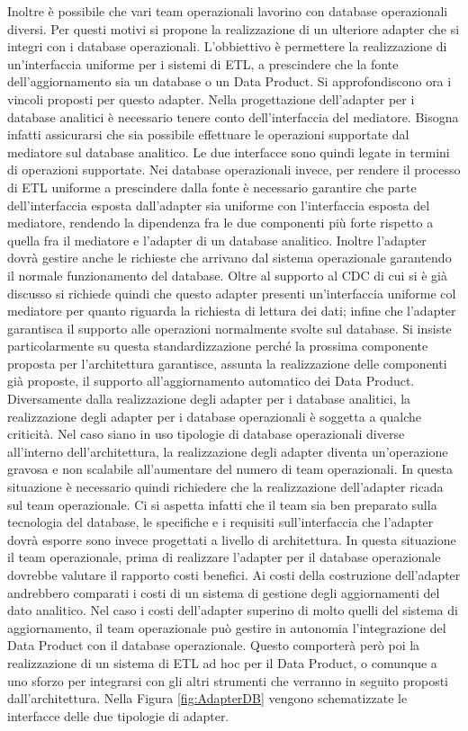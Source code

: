 \documentclass[12pt]{report}
\begin{document}
Inoltre è possibile che vari team operazionali lavorino con database operazionali diversi. 
Per questi motivi si propone la realizzazione di un ulteriore  adapter che si integri con i database operazionali.
L'obbiettivo è permettere la realizzazione di un'interfaccia uniforme per i sistemi di ETL, a prescindere che la fonte dell'aggiornamento sia un database o un Data Product.
Si approfondiscono ora i vincoli proposti per questo adapter.
Nella progettazione dell'adapter per i database analitici è necessario tenere conto dell'interfaccia del mediatore. 
Bisogna infatti assicurarsi che sia possibile effettuare le operazioni supportate dal mediatore sul database analitico.
Le due interfacce sono quindi legate in termini di operazioni supportate.
Nei database operazionali invece, per rendere il processo di ETL uniforme a prescindere dalla fonte è necessario garantire che parte dell'interfaccia esposta dall'adapter sia uniforme con l'interfaccia esposta del mediatore, rendendo la dipendenza fra le due componenti più forte rispetto a quella fra il mediatore e l'adapter di un database analitico.
Inoltre l'adapter dovrà gestire anche le richieste che arrivano dal sistema operazionale garantendo il normale funzionamento del database.
Oltre al supporto al CDC di cui si è già discusso si richiede quindi che questo adapter presenti un'interfaccia uniforme col mediatore per quanto riguarda la richiesta di lettura dei dati; infine che l'adapter garantisca il supporto alle operazioni normalmente svolte sul database.
Si insiste particolarmente su questa standardizzazione perché la prossima componente proposta per l'architettura garantisce, assunta la realizzazione delle componenti già proposte, il supporto all'aggiornamento automatico dei Data Product.
Diversamente dalla realizzazione degli adapter per i database analitici, la realizzazione degli adapter per i database operazionali è soggetta a qualche criticità.
Nel caso siano in uso tipologie di database operazionali diverse all'interno dell'architettura, la realizzazione degli adapter diventa un'operazione gravosa e non scalabile all'aumentare del numero di team operazionali.
In questa situazione è necessario quindi richiedere che la realizzazione dell'adapter ricada sul team operazionale.
Ci si aspetta infatti che il team sia ben preparato sulla tecnologia del database, le specifiche e i requisiti sull'interfaccia che l'adapter dovrà esporre sono invece progettati a livello di architettura.
In questa situazione il team operazionale, prima di realizzare l'adapter per il database operazionale dovrebbe valutare il rapporto costi benefici.
Ai costi della costruzione dell'adapter andrebbero comparati i costi di un sistema di gestione degli aggiornamenti del dato analitico.
Nel caso i costi dell'adapter superino di molto quelli del sistema di aggiornamento, il team operazionale può gestire in autonomia l'integrazione del Data Product con il database operazionale.
Questo comporterà però poi la realizzazione di un sistema di ETL ad hoc per il Data Product, o comunque a uno sforzo per integrarsi con gli altri strumenti che verranno in seguito proposti dall'architettura.
Nella Figura \ref{fig:AdapterDB} vengono schematizzate le interfacce delle due tipologie di adapter. 
\end{document}
